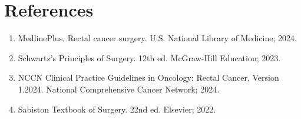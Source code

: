 \section*{References}
\begin{enumerate}
  \item MedlinePlus. Rectal cancer surgery. U.S. National Library of Medicine; 2024.
  
  \item Schwartz's Principles of Surgery. 12th ed. McGraw-Hill Education; 2023.
  
  \item NCCN Clinical Practice Guidelines in Oncology: Rectal Cancer, Version 1.2024. National Comprehensive Cancer Network; 2024.
  
  \item Sabiston Textbook of Surgery. 22nd ed. Elsevier; 2022.
\end{enumerate}

\clearpage

